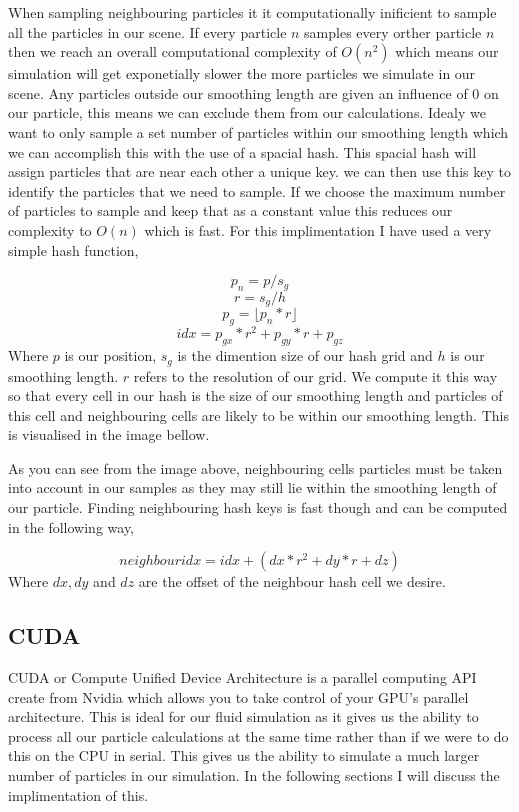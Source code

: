 When sampling neighbouring particles it it computationally inificient to sample all the particles in our scene. If every particle $n$ samples every orther particle $n$ then we reach an overall computational complexity of $O(n^2)$ which means our simulation will get exponetially slower the more particles we simulate in our scene. Any particles outside our smoothing length are given an influence of 0 on our particle, this means we can exclude them from our calculations. Idealy we want to only sample a set number of particles within our smoothing length which we can accomplish this with the use of a spacial hash. This spacial hash will assign particles that are near each other a unique key. we can then use this key to identify the particles that we need to sample. If we choose the maximum number of particles to sample and keep that as a constant value this reduces our complexity to $O(n)$ which is fast. For this implimentation I have used a very simple hash function,\par
 \[ p_n = p/s_g \] \[ r = s_g/h \] \[ p_g = \lfloor p_n*r \rfloor \] \[ idx = p_{gx}*r^2 + p_{gy}*r +p_{gz} \] Where $p$ is our position, $s_g$ is the dimention size of our hash grid and $h$ is our smoothing length. $r$ refers to the resolution of our grid. We compute it this way so that every cell in our hash is the size of our smoothing length and particles of this cell and neighbouring cells are likely to be within our smoothing length. This is visualised in the image bellow.\par
As you can see from the image above, neighbouring cells particles must be taken into account in our samples as they may still lie within the smoothing length of our particle. Finding neighbouring hash keys is fast though and can be computed in the following way,\par
 \[ neighbour idx = idx + (dx*r^2 + dy*r + dz) \] Where $dx,dy$ and $dz$ are the offset of the neighbour hash cell we desire.

\subsection*{C\-U\-D\-A }

C\-U\-D\-A or Compute Unified Device Architecture is a parallel computing A\-P\-I create from Nvidia which allows you to take control of your G\-P\-U's parallel architecture. This is ideal for our fluid simulation as it gives us the ability to process all our particle calculations at the same time rather than if we were to do this on the C\-P\-U in serial. This gives us the ability to simulate a much larger number of particles in our simulation. In the following sections I will discuss the implimentation of this.

